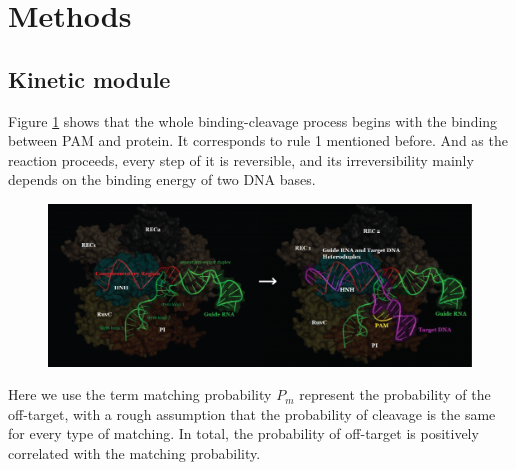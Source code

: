 \section{Methods}
\subsection{Kinetic module}
Figure \ref{fig:2} shows that the whole binding-cleavage process begins with the binding between PAM and protein. It corresponds to rule 1 mentioned before. And as the reaction proceeds, every step of it is reversible, and its irreversibility mainly depends on the binding energy of two DNA bases.
\begin{figure}[h]
\centering
\includegraphics[width=0.7\linewidth]{2}
\caption{}
\label{fig:2}
\end{figure}
%
%
%
	
Here we use the term matching probability $P_{m}$ represent the probability of the off-target, with a rough assumption that the probability of cleavage is the same for every type of matching. In total, the probability of off-target is positively correlated with the matching probability. 

